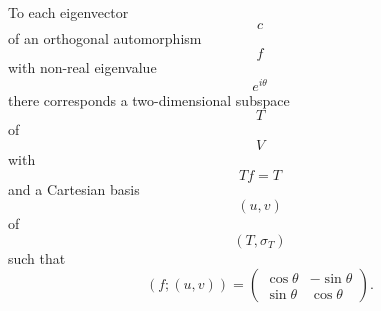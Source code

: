 To each eigenvector $$c$$ of an orthogonal automorphism $$f$$ with non-real eigenvalue $$e^{i\theta}$$ there corresponds a two-dimensional subspace $$T$$ of $$V$$ with $$Tf = T$$ and a Cartesian basis $$(u, v)$$ of $$(T, \sigma_T)$$ such that
$$(f; (u, v)) = \begin{pmatrix} \cos \theta & -\sin \theta \\ \sin \theta & \cos \theta \end{pmatrix}.$$
